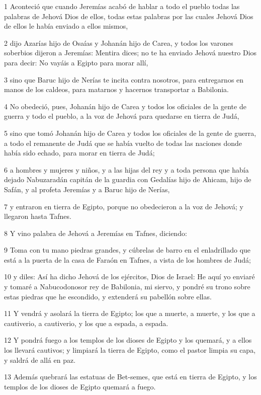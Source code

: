 \par 1 Aconteció que cuando Jeremías acabó de hablar a todo el pueblo todas las palabras de Jehová Dios de ellos, todas estas palabras por las cuales Jehová Dios de ellos le había enviado a ellos mismos,
\par 2 dijo Azarías hijo de Osaías y Johanán hijo de Carea, y todos los varones soberbios dijeron a Jeremías: Mentira dices; no te ha enviado Jehová nuestro Dios para decir: No vayáis a Egipto para morar allí,
\par 3 sino que Baruc hijo de Nerías te incita contra nosotros, para entregarnos en manos de los caldeos, para matarnos y hacernos transportar a Babilonia.
\par 4 No obedeció, pues, Johanán hijo de Carea y todos los oficiales de la gente de guerra y todo el pueblo, a la voz de Jehová para quedarse en tierra de Judá,
\par 5 sino que tomó Johanán hijo de Carea y todos los oficiales de la gente de guerra, a todo el remanente de Judá que se había vuelto de todas las naciones donde había sido echado, para morar en tierra de Judá;
\par 6 a hombres y mujeres y niños, y a las hijas del rey y a toda persona que había dejado Nabuzaradán capitán de la guardia con Gedalías hijo de Ahicam, hijo de Safán, y al profeta Jeremías y a Baruc hijo de Nerías,
\par 7 y entraron en tierra de Egipto, porque no obedecieron a la voz de Jehová; y llegaron hasta Tafnes.
\par 8 Y vino palabra de Jehová a Jeremías en Tafnes, diciendo:
\par 9 Toma con tu mano piedras grandes, y cúbrelas de barro en el enladrillado que está a la puerta de la casa de Faraón en Tafnes, a vista de los hombres de Judá;
\par 10 y diles: Así ha dicho Jehová de los ejércitos, Dios de Israel: He aquí yo enviaré y tomaré a Nabucodonosor rey de Babilonia, mi siervo, y pondré su trono sobre estas piedras que he escondido, y extenderá su pabellón sobre ellas.
\par 11 Y vendrá y asolará la tierra de Egipto; los que a muerte, a muerte, y los que a cautiverio, a cautiverio, y los que a espada, a espada.
\par 12 Y pondrá fuego a los templos de los dioses de Egipto y los quemará, y a ellos los llevará cautivos; y limpiará la tierra de Egipto, como el pastor limpia su capa, y saldrá de allá en paz.
\par 13 Además quebrará las estatuas de Bet-semes, que está en tierra de Egipto, y los templos de los dioses de Egipto quemará a fuego.

